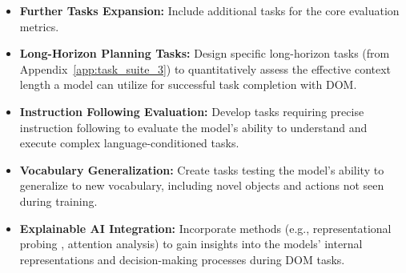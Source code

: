 \begin{itemize}
    \item \textbf{Further Tasks Expansion:} Include additional tasks for the core evaluation metrics.
    
    \item \textbf{Long-Horizon Planning Tasks:} Design specific long-horizon tasks (from Appendix~\ref{app:task_suite_3}) to quantitatively assess the effective context length a model can utilize for successful task completion with DOM.
    
    \item \textbf{Instruction Following Evaluation:} Develop tasks requiring precise instruction following to evaluate the model's ability to understand and execute complex language-conditioned tasks.
    
    \item \textbf{Vocabulary Generalization:} Create tasks testing the model's ability to generalize to new vocabulary, including novel objects and actions not seen during training.
    
    \item \textbf{Explainable AI Integration:} Incorporate methods (e.g., representational probing \cite{Probing-VLA}, attention analysis) to gain insights into the models' internal representations and decision-making processes during DOM tasks.
\end{itemize}


